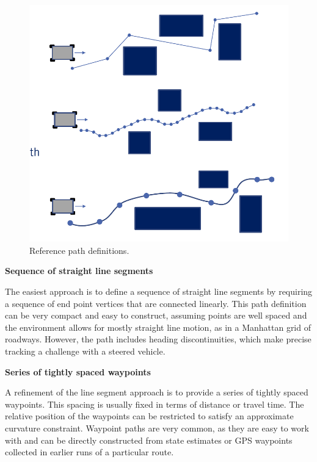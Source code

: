 \begin{figure}[!htb]
\begin{center}
\includegraphics[scale=0.380]{img/lateral_control/reference_path_1.jpeg}
\end{center}
\caption{Reference path definitions.}
\label{reference_path_1}
\end{figure}

\textbf{Sequence of straight line segments}

The easiest approach is to define a sequence of straight line segments by requiring a sequence of end point vertices
that are connected linearly. This path definition can be very compact and easy to construct, assuming points are well spaced and the environment allows for
mostly straight line motion, as in a Manhattan grid of roadways. However, the path includes heading discontinuities, which make precise tracking
a challenge with a steered vehicle. 

\textbf{Series of tightly spaced waypoints}

A refinement of the line segment approach is to provide a series of tightly spaced waypoints. This spacing is usually fixed in
terms of distance or travel time. The relative position of the waypoints can be restricted to satisfy
an approximate curvature constraint. Waypoint paths are very common, as they are easy to work with and
can be directly constructed from state estimates or GPS waypoints collected in earlier runs
of a particular route. 

